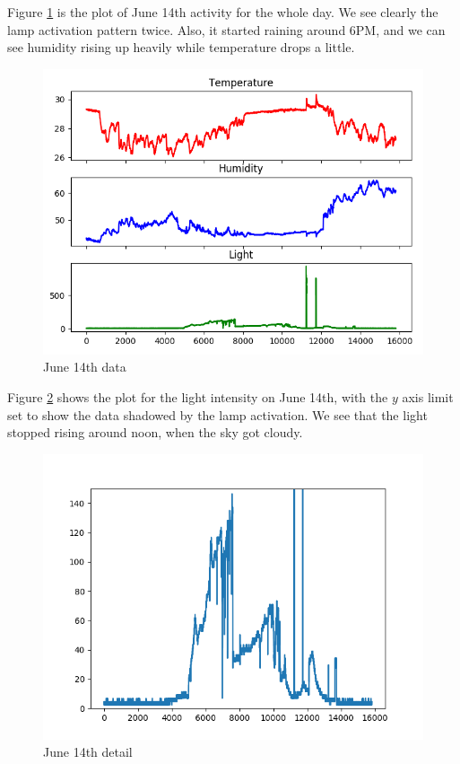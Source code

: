 \documentclass[11pt]{article}
\begin{document}
Figure \ref{fig:june14} is the plot of June 14th activity for the whole day. We see clearly the lamp activation pattern twice. Also, it started raining around 6PM, and we can see humidity rising up heavily while temperature drops a little.

\begin{figure}[h]
\includegraphics[width=\textwidth]{log-20170514}
\caption{June 14th data}
\label{fig:june14}
\end{figure}

Figure \ref{fig:june14light} shows the plot for the light intensity on June 14th, with the $y$ axis limit set to show the data shadowed by the lamp activation. We see that the light stopped rising around noon, when the sky got cloudy. 

\begin{figure}[h]
\includegraphics[width=\textwidth]{log-20170514-light}
\caption{June 14th detail}
\label{fig:june14light}
\end{figure}
\end{document}
